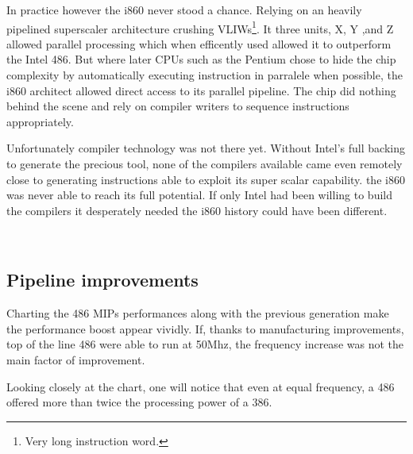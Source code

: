 \bigskip
\par
In practice however the i860 never stood a chance. Relying on an heavily pipelined superscaler architecture crushing VLIWs\footnote{Very long instruction word.}. It three units, X, Y ,and Z allowed parallel processing which when efficently used allowed it to outperform the Intel 486.
But where later CPUs such as the Pentium chose to hide the chip complexity by automatically executing instruction in parralele when possible, the i860 architect allowed direct access to its parallel pipeline. The chip did nothing behind the scene and rely on compiler writers to sequence instructions appropriately.\\
\par
Unfortunately compiler technology was not there yet. Without Intel's full backing to generate the precious tool, none of the compilers available came even remotely close to generating instructions able to exploit its super scalar capability. the i860 was never able to reach its full potential. If only Intel had been willing to build the compilers it desperately needed the i860 history could have been different.\\
\par
\par
{}\\
\par
{}

\par
\subsection{Pipeline improvements}
Charting the 486 MIPs performances along with the previous generation make the performance boost appear vividly. If, thanks to manufacturing improvements, top of the line 486 were able to run at 50Mhz, the frequency increase was not the main factor of improvement.\\
\par
 Looking closely at the chart, one will notice that even at equal frequency, a 486 offered more than twice the processing power of a 386.\\

